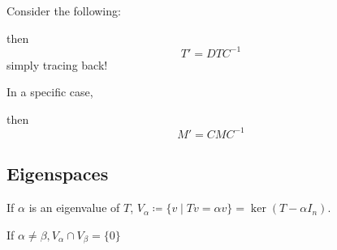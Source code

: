 Consider the following: 



then \[
T' = DTC^{-1}
\]
simply tracing back!

In a specific case,


then \[
M' = CMC^{-1}
\]

\subsection{Eigenspaces}
If \(\alpha\) is an eigenvalue of \(T\), \(V_\alpha  \coloneqq \{v \mid Tv = \alpha v\} = \ker (T - \alpha I_n)\).

\begin{exercise}
If \(\alpha \neq \beta, V_\alpha \cap V_\beta = \{0\}\)
\end{exercise}